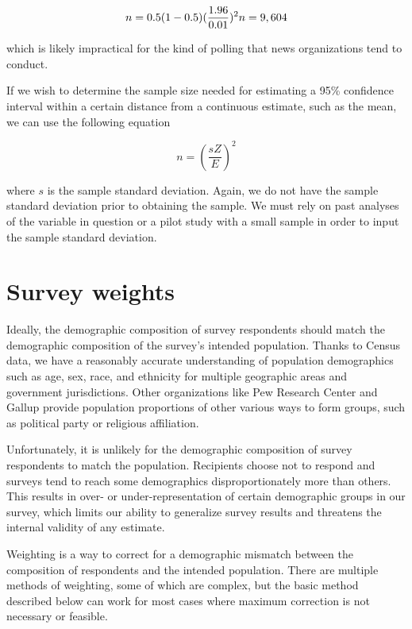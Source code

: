 \documentclass[
]{book}
\begin{document}
\begin{equation}
n=0.5(1-0.5)({\frac{1.96}{0.01}})^2\\
n=9,604
\end{equation}

which is likely impractical for the kind of polling that news organizations tend to conduct.

If we wish to determine the sample size needed for estimating a 95\% confidence interval within a certain distance from a continuous estimate, such as the mean, we can use the following equation

\begin{equation}
n=(\frac{sZ}{E})^2
\label{eq:sampsizemean}
\end{equation}

where \(s\) is the sample standard deviation. Again, we do not have the sample standard deviation prior to obtaining the sample. We must rely on past analyses of the variable in question or a pilot study with a small sample in order to input the sample standard deviation.

\hypertarget{survey-weights}{%
\section{Survey weights}\label{survey-weights}}

Ideally, the demographic composition of survey respondents should match the demographic composition of the survey's intended population. Thanks to Census data, we have a reasonably accurate understanding of population demographics such as age, sex, race, and ethnicity for multiple geographic areas and government jurisdictions. Other organizations like Pew Research Center and Gallup provide population proportions of other various ways to form groups, such as political party or religious affiliation.

Unfortunately, it is unlikely for the demographic composition of survey respondents to match the population. Recipients choose not to respond and surveys tend to reach some demographics disproportionately more than others. This results in over- or under-representation of certain demographic groups in our survey, which limits our ability to generalize survey results and threatens the internal validity of any estimate.

Weighting is a way to correct for a demographic mismatch between the composition of respondents and the intended population. There are multiple methods of weighting, some of which are complex, but the basic method described below can work for most cases where maximum correction is not necessary or feasible.
\end{document}
